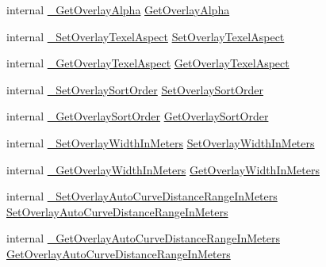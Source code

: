 \begin{DoxyCompactItemize}
\item 
internal \mbox{\hyperlink{struct_valve_1_1_v_r_1_1_i_v_r_overlay_aaaf6e210a7faf2e505719a884eef3529}{\+\_\+\+Get\+Overlay\+Alpha}} \mbox{\hyperlink{struct_valve_1_1_v_r_1_1_i_v_r_overlay_ad03e7b532414a413e53d3f90cf30886a}{Get\+Overlay\+Alpha}}
\item 
internal \mbox{\hyperlink{struct_valve_1_1_v_r_1_1_i_v_r_overlay_a479ce5b1183e93ec53ddbaa1bd62f264}{\+\_\+\+Set\+Overlay\+Texel\+Aspect}} \mbox{\hyperlink{struct_valve_1_1_v_r_1_1_i_v_r_overlay_a4f9bb6e217b727e791775fd282e3df60}{Set\+Overlay\+Texel\+Aspect}}
\item 
internal \mbox{\hyperlink{struct_valve_1_1_v_r_1_1_i_v_r_overlay_a235f2a043c603054667fe6c3df416dce}{\+\_\+\+Get\+Overlay\+Texel\+Aspect}} \mbox{\hyperlink{struct_valve_1_1_v_r_1_1_i_v_r_overlay_af0307f752cded8ffd89a0d9fda03a24e}{Get\+Overlay\+Texel\+Aspect}}
\item 
internal \mbox{\hyperlink{struct_valve_1_1_v_r_1_1_i_v_r_overlay_a49aeba8cdd673c4e9b5e5e3cc1e566d6}{\+\_\+\+Set\+Overlay\+Sort\+Order}} \mbox{\hyperlink{struct_valve_1_1_v_r_1_1_i_v_r_overlay_a491605e83ff3994299668c79867fe3c2}{Set\+Overlay\+Sort\+Order}}
\item 
internal \mbox{\hyperlink{struct_valve_1_1_v_r_1_1_i_v_r_overlay_a7e5ffdaf685b8384808a52d2fef43022}{\+\_\+\+Get\+Overlay\+Sort\+Order}} \mbox{\hyperlink{struct_valve_1_1_v_r_1_1_i_v_r_overlay_a103941f9dbe50d41856eb5a5ff55710a}{Get\+Overlay\+Sort\+Order}}
\item 
internal \mbox{\hyperlink{struct_valve_1_1_v_r_1_1_i_v_r_overlay_ae65d9b762f6024173ed7f2362e7755ce}{\+\_\+\+Set\+Overlay\+Width\+In\+Meters}} \mbox{\hyperlink{struct_valve_1_1_v_r_1_1_i_v_r_overlay_a50e184f773489734a9c84c47e8f03ae1}{Set\+Overlay\+Width\+In\+Meters}}
\item 
internal \mbox{\hyperlink{struct_valve_1_1_v_r_1_1_i_v_r_overlay_a428a94d317b358800d0bb78217345815}{\+\_\+\+Get\+Overlay\+Width\+In\+Meters}} \mbox{\hyperlink{struct_valve_1_1_v_r_1_1_i_v_r_overlay_a77f6dbab37773036db4f0b8d9e502734}{Get\+Overlay\+Width\+In\+Meters}}
\item 
internal \mbox{\hyperlink{struct_valve_1_1_v_r_1_1_i_v_r_overlay_a14c24c561079ac045d2e9fd58b896add}{\+\_\+\+Set\+Overlay\+Auto\+Curve\+Distance\+Range\+In\+Meters}} \mbox{\hyperlink{struct_valve_1_1_v_r_1_1_i_v_r_overlay_aca5881d97e0206709e8f37713e1979cc}{Set\+Overlay\+Auto\+Curve\+Distance\+Range\+In\+Meters}}
\item 
internal \mbox{\hyperlink{struct_valve_1_1_v_r_1_1_i_v_r_overlay_aea87edea8fd7762358e5a3d3dfd94345}{\+\_\+\+Get\+Overlay\+Auto\+Curve\+Distance\+Range\+In\+Meters}} \mbox{\hyperlink{struct_valve_1_1_v_r_1_1_i_v_r_overlay_aef6b5d79ecdb49dc66521e6ec46c345e}{Get\+Overlay\+Auto\+Curve\+Distance\+Range\+In\+Meters}}

\end{DoxyCompactItemize}
